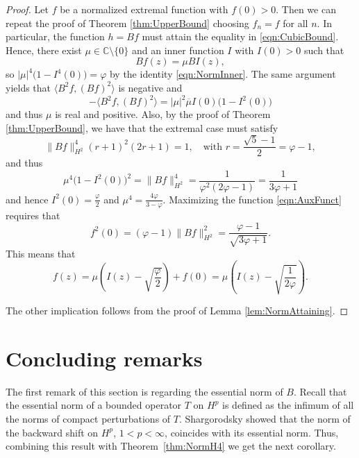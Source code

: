 \documentclass{amsart}
\theoremstyle{plain}
\theoremstyle{definition}
\newcommand{\C}{\mathbb{C}}
\begin{document}
    	\begin{proof}
    		Let $f$ be a normalized extremal function with $f(0) > 0$. Then we can repeat the proof of Theorem \ref{thm:UpperBound} choosing $f_n = f$ for all $n$.
    		In particular, the function $h = B f$ must attain the equality in \eqref{eqn:CubicBound}. Hence, there exist $\mu \in \C \setminus \{ 0 \}$ and an inner function $I$ with $I(0) > 0$ such that
        		\[
        		      Bf(z) = \mu BI (z),
        		\]
        	    so $|\mu|^4 \big(1 - I^4(0) \big) = \varphi$ by the identity \eqref{eqn:NormInner}. The same argument yields that $\langle  B^2f,(Bf)^2\rangle$ is negative and
        		\[
        		-\langle  B^2f,(Bf)^2\rangle=|\mu|^2\overline{\mu}I(0)\big (1-I^2(0) \big)
        		\]
        		and thus $\mu$ is real and positive. Also, by the proof of Theorem \ref{thm:UpperBound}, we have that the extremal case must satisfy 
        		\[
                    \| Bf \|_{H^2}^4 (r + 1)^2 (2r + 1) = 1, \quad \mbox{with } r=\frac{\sqrt{5}-1}{2} = \varphi - 1,
                \]
                and thus
        		\[
        		\mu^4 \big(1 - I^2(0) \big)^2 =\| Bf \|_{H^2}^4 = \dfrac{1}{\varphi^2(2 \varphi - 1)} = \dfrac{1}{3\varphi + 1}
        		\]
        		and hence $I^2(0) = \frac{\varphi}{2}$ and $\mu^4 = \frac{4\varphi}{3 - \varphi}$.  Maximizing the function \eqref{eqn:AuxFunct} requires that
        		\[
        		f^2(0) = (\varphi - 1) \| Bf \|_{H^2}^2 = \dfrac{\varphi - 1}{\sqrt{3 \varphi + 1}}.
        		\]
        		This means that
        		\[
        		f(z) = \mu \left( I(z) - \sqrt{\dfrac{\varphi}{2}}\right) + f(0) = \mu \left( I(z) - \sqrt{\dfrac{1}{2\varphi}}\right).
        		\]
    		
    		The other implication follows from the proof of Lemma \ref{lem:NormAttaining}.	
    	\end{proof}
	
	
	\section{Concluding remarks} \label{sec:ConcludingRemarks}
	
    	The first remark of this section is regarding the essential norm of $B$. Recall that the essential norm of a bounded operator $T$ on $H^p$ is defined as the infimum of all the norms of compact perturbations of $T$. Shargorodsky \cite[Theorem~5.1]{MR4169308} showed that the norm of the backward shift on $H^p$, $1 < p < \infty$, coincides with its essential norm. Thus, combining this result with Theorem~\ref{thm:NormH4} we get the next corollary.
    	
\end{document}

